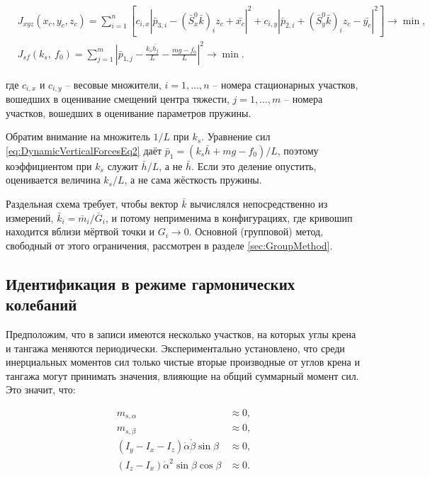 \begin{equation}
\label{eq:LeastSquareMethodFormulation}
\begin{aligned}
& J_{xyz}\left(x_c,y_c,z_c\right)=\sum_{i=1}^n\left[
c_{i,x}\left|\bar{p}_{3,i}-\left(\bar{S}_x^0\bar{k}\right)_iz_c + \bar{x_c}\right|^2
+ c_{i,y}\left|\bar{p}_{2,i}+\left(\bar{S}_y^0\bar{k}\right)_iz_c - \bar{y_c}\right|^2\right]
\rightarrow\min, \\
& J_{sf}\left(k_s,~f_0\right)=\sum_{j=1}^m{\left|\bar{p}_{1,j}-\frac{k_s\bar{h_j}}{L}-\frac{mg-f_0}{L}\right|}^2
\rightarrow\min.
\end{aligned}
\end{equation}

где $c_{i,x}$ и $c_{i,y}$ -- весовые множители, $i = 1,\dots,n$ -- номера стационарных участков, вошедших в оценивание смещений центра тяжести, $j = 1,\dots,m$ -- номера участков, вошедших в оценивание параметров пружины.

Обратим внимание на множитель $1/L$ при $k_s$. Уравнение сил \ref{eq:DynamicVerticalForcesEq2} даёт $\bar{p}_1 = \left(k_s\bar{h} + mg - f_0\right)/L$, поэтому коэффициентом при $k_s$ служит $\bar{h}/L$, а не $\bar{h}$. Если это деление опустить, оценивается величина $k_s/L$, а не сама жёсткость пружины.

Раздельная схема требует, чтобы вектор $\bar{k}$ вычислялся непосредственно из измерений, $\bar{k}_i = \bar{m}_i/\bar{G}_i$, и потому неприменима в конфигурациях, где кривошип находится вблизи мёртвой точки и $G_i \to 0$. Основной (групповой) метод, свободный от этого ограничения, рассмотрен в разделе \ref{sec:GroupMethod}.

\subsection{Идентификация в режиме гармонических колебаний}
Предположим, что в записи имеются несколько участков, на которых углы крена и тангажа меняются периодически. Экспериментально установлено, что среди инерциальных моментов сил только чистые вторые производные от углов крена и тангажа могут принимать значения, влияющие на общий суммарный момент сил. Это значит, что:

\begin{equation}
\begin{aligned}
m_{s,\alpha} & \approx 0,\\
m_{s,\beta} & \approx 0,\\
\left(I_y - I_x - I_z\right)\dot{\alpha}\dot{\beta}\sin{\beta} & \approx 0,\\
\left(I_z - I_x\right)\dot{\alpha}^2 \sin{\beta}\cos{\beta} & \approx 0.
\end{aligned}
\end{equation}

